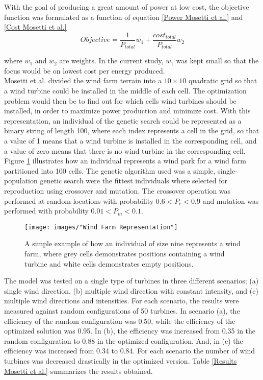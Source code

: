 \noindent With the goal of producing a great amount of power at low cost, the objective function was formulated as a function of equation \ref{Power Mosetti et al.} and \ref{Cost Mosetti et al.}\\


\begin{equation}
Objective = \frac{1}{P_{total}}w_1 + \frac{cost_{total}}{P_{total}}w_2
\label{Objective function Mosetti et al.}
\end{equation}


\noindent where $w_1$ and $w_2$ are weights. In the current study, $w_1$ was kept small so that the focus would be on lowest cost per energy produced. \\

\noindent Mosetti et al. divided the wind farm terrain into a $10\times10$ quadratic grid so that a wind turbine could be installed in the middle of each cell. The optimization problem would then be to find out for which cells wind turbines should be installed, in order to maximize power production and minimize cost. With this representation, an individual of the genetic search could be represented as a binary string of length 100, where each index represents a cell in the grid, so that a value of 1 means that a wind turbine is installed in the corresponding cell, and a value of zero means that there is no wind turbine in the corresponding cell. Figure \ref{Wind Farm Representation} illustrates how an individual represents a wind park for a wind farm partitioned into 100 cells. The genetic algorithm used was a simple, single-population genetic search were the fittest individuals where selected for reproduction using crossover and mutation. The crossover operation was performed at random locations with probability $0.6 < P_c < 0.9$ and mutation was performed with probability $0.01 < P_m < 0.1$. \\


\begin{figure}[h!]
\begin{center}
\texttt{[image: images/"Wind Farm Representation"]}
\caption{A simple example of how an individual of size nine represents a wind farm, where grey cells demonstrates positions containing a wind turbine and white cells demonstrates empty positions. }
\label{Wind Farm Representation}
\end{center}
\end{figure}


\noindent The model was tested on a single type of turbines in three different scenarios; (a) single wind direction, (b) multiple wind direction with constant intensity, and (c) multiple wind directions and intensities. For each scenario, the results were measured against random configurations of 50 turbines. In scenario (a), the efficiency of the random configuration was 0.50, while the efficiency of the optimized solution was 0.95. In (b), the efficiency was increased from 0.35 in the random configuration to 0.88 in the optimized configuration. And, in (c) the efficiency was increased from 0.34 to 0.84. For each scenario the number of wind turbines was decreased drastically in the optimized version. Table \ref{Results Mosetti et al.} summarizes the results obtained.

